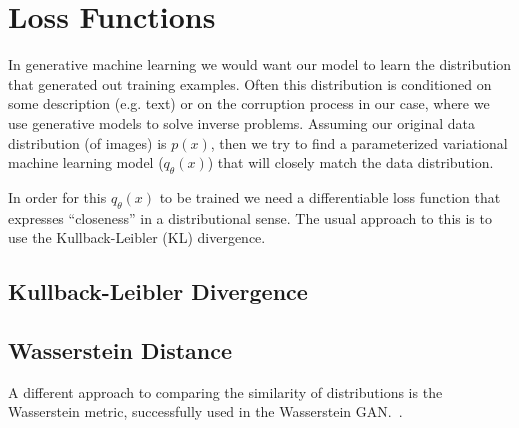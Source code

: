 \section{Loss Functions}
In generative machine learning we would want our model to learn the distribution that generated
out training examples. Often this distribution is conditioned on some description (e.g. text) or
on the corruption process in our case, where we use generative models to solve inverse problems.
Assuming our original data distribution (of images) is $p(x)$, then we try to find a parameterized
variational machine learning model ($q_{\theta}(x)$) that will closely match the data distribution.

In order for this $q_{\theta}(x)$ to be trained we need a differentiable loss function that expresses
\enquote{closeness} in a distributional sense. The usual approach to this is to use the Kullback-Leibler (KL)
divergence.

\subsection{Kullback-Leibler Divergence}

\subsection{Wasserstein Distance}
A different approach to comparing the similarity of distributions is the Wasserstein metric, successfully used in the Wasserstein GAN.~\autocite{arjovsky2017wasserstein}.